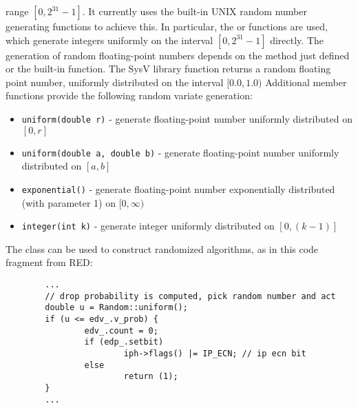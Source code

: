 range $[0,2^{31}-1]$.
It currently uses the built-in UNIX random number generating
functions to achieve this.
In particular,
the  or  functions are used, which generate
integers uniformly
on the interval $[0,2^{31}-1]$ directly.
The generation of random floating-point numbers depends on
the  method just defined or the built-in 
function.
The SysV library function  returns a random floating
point number, uniformly distributed on the interval $[0.0, 1.0)$
Additional member functions provide the following random variate
generation:
\begin{itemize}
        \item {\tt uniform(double r)} - generate floating-point number uniformly distributed on $[0,r]$
        \item {\tt uniform(double a, double b)} - generate floating-point number uniformly distributed on $[a,b]$
        \item {\tt exponential()} - generate floating-point number exponentially distributed (with parameter 1) on $[0, \infty)$
        \item {\tt integer(int k)} - generate integer uniformly distributed on $[0, (k-1)]$
\end{itemize}
The  class can be used to construct randomized algorithms,
as in this code fragment from RED:
\begin{small}
\begin{verbatim}
        ...
        // drop probability is computed, pick random number and act
        double u = Random::uniform();
        if (u <= edv_.v_prob) {
                edv_.count = 0;
                if (edp_.setbit) 
                        iph->flags() |= IP_ECN; // ip ecn bit
                else
                        return (1);
        }
        ...
\end{verbatim}
\end{small}

